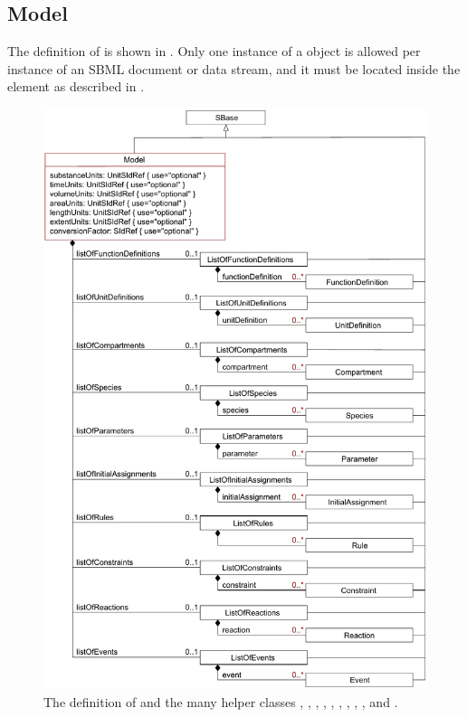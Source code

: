 \subsection{Model}
\label{sec:model}

The definition of \Model is shown in .
Only one instance of a \Model object is allowed per instance of an
SBML \thisLV document or data stream, and it must be located
inside the  element as described in
.

\begin{figure}[htbp]
  \centering
  \includegraphics[scale=0.75]{figs/model-uml}
  \caption{The definition of \Model and the many helper
      classes \ListOfFunctionDefinitions, \ListOfUnitDefinitions,
      \ListOfCompartments, \ListOfSpecies, \ListOfParameters,
      \ListOfInitialAssignments, \ListOfRules, \ListOfConstraints,
      \ListOfReactions, and \ListOfEvents.}
  \label{fig:model}
\end{figure}

